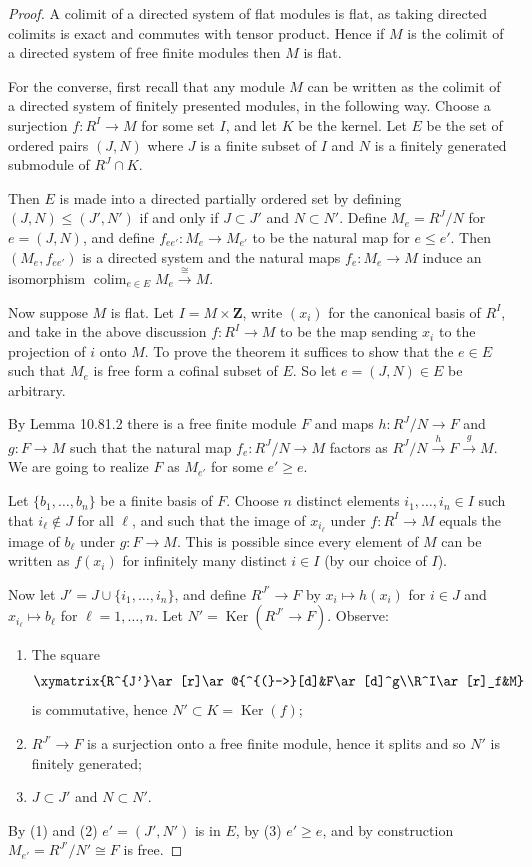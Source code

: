 \documentclass[UTF8,11pt]{ctexart}
\theoremstyle{definition}
\newcommand{\R}{\mathbb R}
\begin{document}
\begin{proof}
A colimit of a directed system of flat modules is flat, as taking directed colimits is exact and commutes with tensor product. Hence if $M$ is the colimit of a directed system of free finite modules then $M$ is flat.

For the converse, first recall that any module $M$ can be written as the colimit of a directed system of finitely presented modules, in the following way. Choose a surjection $f:R^I\to M$ for some set $I$, and let $K$ be the kernel. Let $E$ be the set of ordered pairs $(J,N)$ where $J$ is a finite subset of $I$ and $N$ is a finitely generated submodule of $R^J\cap K$.

Then $E$ is made into a directed partially ordered set by defining $(J,N)\leq(J',N')$ if and only if $J\subset J'$ and $N\subset N'$. Define $M_e=R^J/N$ for $e=(J,N)$, and define $f_{ee'}:M_e\to M_{e'}$ to be the natural map for $e\leq e'$. Then $(M_e,f_{ee'})$ is a directed system and the natural maps $f_e:M_e\to M$ induce an isomorphism $\operatorname{colim}_{e\in E}M_e\xrightarrow{\cong}M$.

Now suppose $M$ is flat. Let $I=M\times\mathbf Z$, write $(x_i)$ for the canonical basis of $R^I$, and take in the above discussion $f:R^I\to M$ to be the map sending $x_i$ to the projection of $i$ onto $M$. To prove the theorem it suffices to show that the $e\in E$ such that $M_e$ is free form a cofinal subset of $E$. So let $e=(J,N)\in E$ be arbitrary.

By Lemma 10.81.2 there is a free finite module $F$ and maps $h:R^J/N\to F$ and $g:F\to M$ such that the natural map $f_e:R^J/N\to M$ factors as $R^J/N\xrightarrow{h}F\xrightarrow{g}M$. We are going to realize $F$ as $M_{e'}$ for some $e'\geq e$.

Let $\{b_1,\ldots,b_n\}$ be a finite basis of $F$. Choose $n$ distinct elements $i_1,\ldots,i_n\in I$ such that $i_\ell\notin J$ for all $\ell$, and such that the image of $x_{i_\ell}$ under $f:R^I\to M$ equals the image of $b_\ell$ under $g:F\to M$. This is possible since every element of $M$ can be written as $f(x_i)$ for infinitely many distinct $i\in I$ (by our choice of $I$).

Now let $J'=J\cup\{i_1,\ldots,i_n\}$, and define $R^{J'}\to F$ by $x_i\mapsto h(x_i)$ for $i\in J$ and $x_{i_\ell}\mapsto b_\ell$ for $\ell=1,\ldots,n$. Let $N'=\operatorname{Ker}(R^{J'}\to F)$. Observe:
\begin{enumerate}
\item The square
\[\xymatrix{R^{J'}\ar[r]\ar@{^{(}->}[d]&F\ar[d]^g\\R^I\ar[r]_f&M}\]
is commutative, hence $N'\subset K=\operatorname{Ker}(f)$;
\item $R^{J'}\to F$ is a surjection onto a free finite module, hence it splits and so $N'$ is finitely generated;
\item $J\subset J'$ and $N\subset N'$.
\end{enumerate}
By (1) and (2) $e'=(J',N')$ is in $E$, by (3) $e'\geq e$, and by construction $M_{e'}=R^{J'}/N'\cong F$ is free.
\end{proof}
\end{document}
